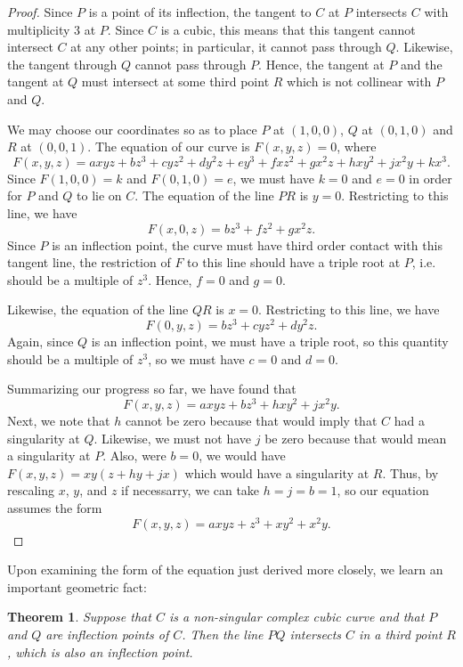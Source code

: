 \documentclass[12pt]{article}
\newtheorem{thm}{Theorem}
\begin{document}
\begin{proof}
Since $P$ is a point of its inflection, the tangent to $C$
at $P$ intersects $C$ with multiplicity 3 at $P$.  Since
$C$ is a cubic, this means that this tangent cannot 
intersect $C$ at any other points; in particular, it 
cannot pass through $Q$.  Likewise, the tangent through
$Q$ cannot pass through $P$.  Hence, the tangent at $P$ 
and the tangent at $Q$ must intersect at some third point
$R$ which is not collinear with $P$ and $Q$.

We may choose our coordinates so as to place $P$ at $(1,0,0)$,
$Q$ at $(0,1,0)$ and $R$ at $(0,0,1)$.  The equation of our
curve is $F(x,y,z) = 0$, where
\[
 F(x,y,z) = a xyz + b z^3 + c y z^2 + d y^2 z + e y^3 +
            f x z^2 + g x^2 z + h x y^2 + j x^2 y + k x^3 .
\]
Since $F(1,0,0) = k$ and $F(0,1,0) = e$, we must have
$k = 0$ and $e = 0$ in order for $P$ and $Q$ to lie on 
$C$.  The equation of the line $PR$ is $y = 0$.  
Restricting to this line, we have
\[
 F(x,0,z) = b z^3 + f z^2 + g x^2 z .
\]  
Since $P$ is an inflection point, the curve must have
third order contact with this tangent line, the restriction
of $F$ to this line should have a triple root at $P$,
i.e. should be a multiple of $z^3$.  Hence, $f = 0$ and
$g = 0$.  

Likewise, the equation of the line $QR$ is $x = 0$.
Restricting to this line, we have
\[
 F(0,y,z) = b z^3 + c y z^2 + d y^2 z . 
\]
Again, since $Q$ is an inflection point, we must have
a triple root, so this quantity should be a multiple
of $z^3$, so we must have $c = 0$ and $d = 0$.

Summarizing our progress so far, we have found that
\[
 F(x,y,z) = a xyz + b z^3 + h x y^2 + j x^2 y .
\]
Next, we note that $h$ cannot be zero because that
would imply that $C$ had a singularity at $Q$.  
Likewise, we must not have $j$ be zero because that
would mean a singularity at $P$.  Also, were $b = 0$,
we would have $F(x,y,z) = xy(z+hy+jx)$ which would
have a singularity at $R$. Thus, by rescaling
$x$, $y$, and $z$ if necessarry, we can take 
$h = j = b = 1$, so our equation assumes the form
\[
 F(x,y,z) = a xyz + z^3 + x y^2 + x^2 y .
\] 
\end{proof}

Upon examining the form of the equation just derived
more closely, we learn an important geometric fact:

\begin{thm}
Suppose that $C$ is a non-singular complex cubic curve
and that $P$ and $Q$ are inflection points of $C$.  Then
the line $PQ$ intersects $C$ in a third point $R$, which
is also an inflection point.
\end{thm}
\end{document}
